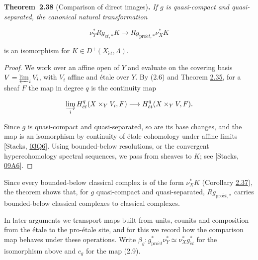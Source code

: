 \documentclass[11pt]{article}
\newenvironment{bpstatement}[2]{\par\addvspace{0.6\baselineskip}\noindent\textbf{#1}#2\textbf{.}\enspace\ignorespaces}
  {\par\addvspace{0.4\baselineskip}}
\newenvironment{bpstatementit}[2]{\begin{bpstatement}{#1}{#2}\itshape\ignorespaces}{\end{bpstatement}}
\begin{document}
\label{bp113}%
\begin{bpstatementit}{Theorem~2.38}{ (Comparison of direct images)}
If \(g\) is quasi-compact and quasi-separated, the canonical natural transformation

\[
\nu_Y^*Rg_{\acute{e}t,*}K\longrightarrow
Rg_{\mathrm{pro}\acute{e}t,*}\nu_X^*K
\tag{2.9}
\]

is an isomorphism for \(K\in D^+(X_{\acute{e}t},\Lambda)\).
\end{bpstatementit}

\begin{proof}[{Proof}]\label{bp114}%
We work over an affine open of \(Y\) and evaluate on the covering basis \(V=\varprojlim_iV_i\), with \(V_i\) affine and étale over \(Y\). By (2.6) and Theorem \hyperref[bp103]{2.35}, for a sheaf \(F\) the map in degree \(q\) is the continuity map

\[
\varinjlim_i H^q_{\acute{e}t}(X\times_YV_i,F)
\longrightarrow
H^q_{\acute{e}t}(X\times_YV,F).
\]

Since \(g\) is quasi-compact and quasi-separated, so are its base changes, and the map is an isomorphism by continuity of étale cohomology under affine limits [Stacks, \href{https://stacks.math.columbia.edu/tag/03Q6}{03Q6}]. Using bounded-below resolutions, or the convergent hypercohomology spectral sequences, we pass from sheaves to \(K\); see [Stacks, \href{https://stacks.math.columbia.edu/tag/09A6}{09A6}].
\end{proof}

\label{bp115}%
Since every bounded-below classical complex is of the form \(\nu_X^*K\) (Corollary \hyperref[bp109]{2.37}), the theorem shows that, for \(g\) quasi-compact and quasi-separated, \(Rg_{\mathrm{pro}\acute{e}t,*}\) carries bounded-below classical complexes to classical complexes.

In later arguments we transport maps built from units, counits and composition from the étale to the pro-étale site, and for this we record how the comparison map behaves under these operations. Write \(\beta_g:g_{\mathrm{pro}\acute{e}t}^*\nu_Y^*\simeq\nu_X^*g_{\acute{e}t}^*\) for the isomorphism above and \(c_g\) for the map (2.9).
\end{document}
